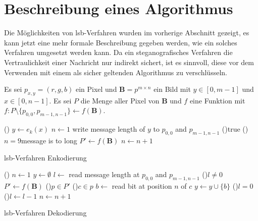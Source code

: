 \section{Beschreibung eines Algorithmus}
Die Möglichkeiten von \acs{lsb}-Verfahren wurden im vorherige Abschnitt gezeigt,
es kann jetzt eine mehr formale Beschreibung gegeben werden,
wie ein solches Verfahren umgesetzt werden kann.
Da ein steganografisches Verfahren die Vertraulichkeit einer Nachricht
nur indirekt sichert, ist es sinnvoll, diese vor dem Verwenden mit einem
als sicher geltenden Algorithmus zu verschlüsseln.

\begin{definition}
  Es sei $p_{x,y} = (r,g,b)$ ein Pixel und $\mathbf{B} = p^{m \times n}$ ein Bild
  mit $y \in [0, m-1]$ und $x \in [0, n-1]$. Es sei $P$ die Menge aller Pixel von $\mathbf{B}$
  und $f$ eine
  Funktion mit $f: P \setminus \{p_{0,0},p_{m-1,n-1}\} \leftarrow f(\mathbf{B})$.

  \begin{algorithm}
    \DontPrintSemicolon
    \Begin(){
      $y \leftarrow e_k(x)$\;
      $n \leftarrow 1$\;
      write message length of $y$ to $p_{0,0}$ and $p_{m-1,n-1}$\;
      \While(){true}{
        \lIf(){$n = 9$}{message is to long}
        $P' \leftarrow f(\mathbf{B})$\;
        $n \leftarrow n + 1$\;
      }
    }
    \caption{\acs{lsb}-Verfahren Enkodierung}
  \end{algorithm}
  \begin{algorithm}[H]
    \DontPrintSemicolon
    \Begin(){
      $n \leftarrow 1$\;
      $y \leftarrow \emptyset$\;
      $l \leftarrow$ read message length at $p_{0,0}$ and $p_{m-1,n-1}$\;
      \While(){$l \neq 0$}{
        $P' \leftarrow f(\mathbf{B})$\;
        \For(){$p \in P'$}{
          \For(){$c \in p$}{
            $b \leftarrow$ read bit at position $n$ of $c$\;
            $y \leftarrow y \cup \{b\}$\;
            \lIf(){$l = 0$} {
            }
            \lElse(){$l \leftarrow l - 1$}
          }
        }
        $n \leftarrow n + 1$\;
      }
    }
    \caption{\acs{lsb}-Verfahren Dekodierung}
  \end{algorithm}
\end{definition}
